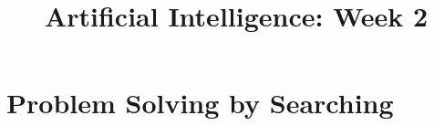 \documentclass[twoside]{article}
\title{Artificial Intelligence: Week 2}
\date{}
\author{}
\begin{document}
\maketitle
\section{Problem Solving by Searching}
\end{document}
